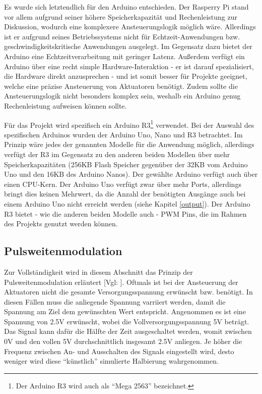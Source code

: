 Es wurde sich letztendlich für den Arduino entschieden.
Der Rasperry Pi stand vor allem aufgrund seiner höhere Speicherkapazität und Rechenleistung zur Diskussion, wodurch eine komplexere Ansteuerungslogik möglich wäre.
Allerdings ist er aufgrund seines Betriebssystems nicht für Echtzeit-Anwendungen bzw. geschwindigkeitskritische Anwendungen ausgelegt.
Im Gegensatz dazu bietet der Arduino eine Echtzeitverarbeitung mit geringer Latenz.
Außerdem verfügt ein Arduino über eine recht simple Hardware-Interaktion - er ist darauf spezialisiert, die Hardware direkt anzusprechen - und ist somit besser für Projekte geeignet, welche eine präzise Ansteuerung von Aktuatoren benötigt. %
Zudem sollte die Ansteuerungslogik nicht besonders komplex sein, weshalb ein Arduino genug Rechenleistung aufweisen können sollte.

Für das Projekt wird spezifisch ein Arduino R3\footnote{Der Arduino R3 wird auch als \enquote{Mega 2563} bezeichnet.} verwendet.
Bei der Auswahl des spezifischen Arduinos wurden der Arduino Uno, Nano und R3 betrachtet.
Im Prinzip wäre jedes der genannten Modelle für die Anwendung möglich, allerdings verfügt der R3 im Gegensatz zu den anderen beiden Modellen über mehr Speicherkapazitäten (256KB Flash Speicher
gegenüber der 32KB vom Arduino Uno und den 16KB des Arduino Nanos). Der gewählte Arduino verfügt auch über einen CPU-Kern.
Der Arduino Uno verfügt zwar über mehr Ports, allerdings bringt dies keinen Mehrwert, da die Anzahl der benötigten Ausgänge auch bei einem Arduino Uno nicht erreicht werden
(siehe Kapitel \ref{output}).
Der Arduino R3 bietet - wie die anderen beiden Modelle auch - \ac{PWM} Pins, die im Rahmen des Projekts genutzt werden können.

\subsection{Pulsweitenmodulation}\label{PWM}
Zur Vollständigkeit wird in diesem Abschnitt das Prinzip der Pulsweitenmodulation erläutert [Vgl: \cite*[siehe ][]{PWM}].
Oftmals ist bei der Ansteuerung der Aktuatoren nicht die gesamte Versorgungsspannung erwünscht bzw. benötigt.
In diesen Fällen muss die anliegende Spannung varriiert werden, damit die Spannung am Ziel dem gewünschten Wert entspricht.
Angenommen es ist eine Spannung von 2.5V erwünscht, wobei die Vollversorgungsspannung 5V beträgt.
Das Signal kann dafür die Hälfte der Zeit ausgeschaltet werden, womit zwischen 0V und den vollen 5V durchschnittlich insgesamt 2.5V anliegen.
Je höher die Frequenz zwischen An- und Ausschalten des Signals eingestellt wird, desto weniger wird diese \enquote{künstlich} simulierte Halbierung wahrgenommen.

